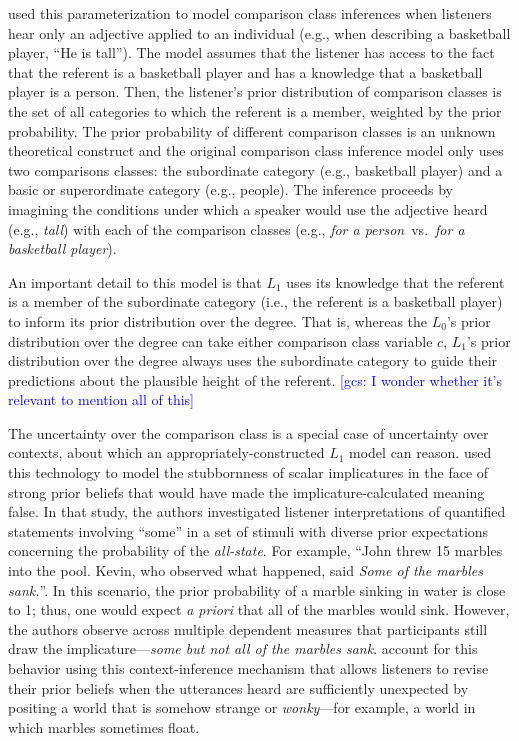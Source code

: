 \documentclass{sp}
\newcommand{\gcs}[1]{\textcolor{blue}{[gcs: #1]}}
\begin{document}
\cite{tessler2017comparisonclass} used this parameterization to model comparison class inferences when listeners hear only an adjective applied to an individual (e.g., when describing a basketball player, ``He is tall'').
The model assumes that the listener has access to the fact that the referent is a basketball player and has a knowledge that a basketball player is a person. Then, the listener's prior distribution of comparison classes is the set of all categories to which the referent is a member, weighted by the prior probability. The prior probability of different comparison classes is an unknown theoretical construct and the original comparison class inference model only uses two comparisons classes: the subordinate category (e.g., basketball player) and a basic or superordinate category (e.g., people). The inference proceeds by imagining the conditions under which a speaker would use the adjective heard (e.g., \emph{tall}) with each of the comparison classes (e.g., \emph{for a person}~vs.~\emph{for a basketball player}). 


An important detail to this model is that $L_1$ uses its knowledge that the referent is a member of the subordinate category (i.e., the referent is a basketball player) to inform its prior distribution over the degree. That is, whereas the $L_0$'s prior distribution over the degree can take either comparison class variable $c$, $L_1$'s prior distribution over the degree always uses the subordinate category to guide their predictions about the plausible height of the referent. \gcs{I wonder whether it's relevant to mention all of this}

The uncertainty over the comparison class is a special case of uncertainty over contexts, about which an appropriately-constructed $L_1$ model can reason. \cite{degen2015wonky} used this technology to model the stubbornness of scalar implicatures in the face of strong prior beliefs that would have made the implicature-calculated meaning false. In that study, the authors investigated listener interpretations of quantified statements involving ``some'' in a set of stimuli with diverse prior expectations concerning the probability of the \emph{all-state}. For example, ``John threw 15 marbles into the pool. Kevin, who observed what happened, said \emph{Some of the marbles sank.}''. In this scenario, the prior probability of a marble sinking in water is close to 1; thus, one would expect \emph{a priori} that all of the marbles would sink. However, the authors observe across multiple dependent measures that participants still draw the implicature---\emph{some but not all of the marbles sank}. \citeauthor{degen2015wonky} account for this behavior using this context-inference mechanism that allows listeners to revise their prior beliefs when the utterances heard are sufficiently unexpected by positing a world that is somehow strange or \emph{wonky}---for example, a world in which marbles sometimes float.
\end{document}
